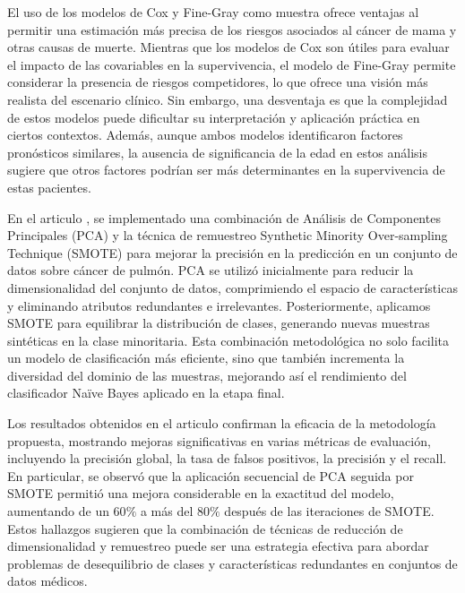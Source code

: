 \documentclass[10pt,journal,compsoc]{IEEEtran}
\begin{document}
El uso de los modelos de Cox y Fine-Gray como muestra \citet{ferraz2017} ofrece ventajas al permitir una estimación más precisa de los riesgos asociados al cáncer de mama y otras causas de muerte. Mientras que los modelos de Cox son útiles para evaluar el impacto de las covariables en la supervivencia, el modelo de Fine-Gray permite considerar la presencia de riesgos competidores, lo que ofrece una visión más realista del escenario clínico. Sin embargo, una desventaja es que la complejidad de estos modelos puede dificultar su interpretación y aplicación práctica en ciertos contextos. Además, aunque ambos modelos identificaron factores pronósticos similares, la ausencia de significancia de la edad en estos análisis sugiere que otros factores podrían ser más determinantes en la supervivencia de estas pacientes.

En el articulo \citet{arxiv14031949}, se implementado una combinación de Análisis de Componentes Principales (PCA) y la técnica de remuestreo Synthetic Minority Over-sampling Technique (SMOTE) para mejorar la precisión en la predicción en un conjunto de datos sobre cáncer de pulmón. PCA se utilizó inicialmente para reducir la dimensionalidad del conjunto de datos, comprimiendo el espacio de características y eliminando atributos redundantes e irrelevantes. Posteriormente, aplicamos SMOTE para equilibrar la distribución de clases, generando nuevas muestras sintéticas en la clase minoritaria. Esta combinación metodológica no solo facilita un modelo de clasificación más eficiente, sino que también incrementa la diversidad del dominio de las muestras, mejorando así el rendimiento del clasificador Naïve Bayes aplicado en la etapa final.

Los resultados obtenidos en el articulo  \citet{arxiv14031949} confirman la eficacia de la metodología propuesta, mostrando mejoras significativas en varias métricas de evaluación, incluyendo la precisión global, la tasa de falsos positivos, la precisión y el recall. En particular, se observó que la aplicación secuencial de PCA seguida por SMOTE permitió una mejora considerable en la exactitud del modelo, aumentando de un 60$\%$ a más del 80$\%$ después de las iteraciones de SMOTE. Estos hallazgos sugieren que la combinación de técnicas de reducción de dimensionalidad y remuestreo puede ser una estrategia efectiva para abordar problemas de desequilibrio de clases y características redundantes en conjuntos de datos médicos.
\end{document}
